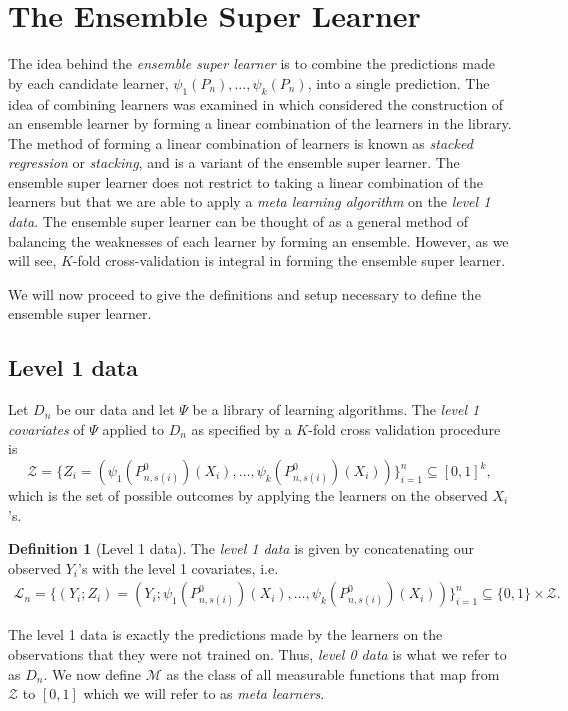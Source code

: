\documentclass[11pt, a4paper]{article}
\theoremstyle{definition}
\newtheorem{definition}[theorem]{Definition}
\theoremstyle{remark}
\newcommand{\ml}{k}
\newcommand{\la}{\psi}
\newcommand{\lib}{\Psi}
\newcommand{\lone}{\mathcal{L}}
\begin{document}
\section{The Ensemble Super Learner}
The idea behind the \textit{ensemble super learner} is to combine the predictions made by each candidate learner, $\la_1(P_{n}), \ldots, \la_k(P_{n}) $, into a single prediction. The idea of combining learners was examined in \cite{breiman1996stacked} which considered the construction of an ensemble learner by forming a linear combination of the learners in the library. The method of forming a linear combination of learners is known as \textit{stacked regression} or \textit{stacking}, and is a variant of the ensemble super learner. The ensemble super learner does not restrict to taking a linear combination of the learners but that we are able to apply a \textit{meta learning algorithm} on the \textit{level 1 data}. The ensemble super learner can be thought of as a general method of balancing the weaknesses of each learner by forming an ensemble. However, as we will see, $ K $-fold cross-validation is integral in forming the ensemble super learner. 

We will now proceed to give the definitions and setup necessary to define the ensemble super learner.
\subsection{Level 1 data}
Let $ D_n $ be our data and let $ \lib $ be a library of learning algorithms. The \textit{level 1 covariates} of $ \lib $ applied to $ D_n $ as specified by a $ K $-fold cross validation procedure is  
$$ \mathcal{Z} = \{Z_i = (\la_1(P_{n, s(i)}^{0})(X_i), \ldots, \la_\ml(P_{n, s(i)}^0)(X_i) ) \}_{i = 1}^{n} \subseteq [0,1]^{k}, $$
which is the set of possible outcomes by applying the learners on the observed $ X_i $'s. 

\begin{definition}[Level 1 data]
    The \textit{level 1 data} is given by concatenating our observed $ Y_i $'s with the level 1 covariates, i.e.
    \begin{align*}
        \lone_{n}  = \{(Y_i ; Z_i) = (Y_i; \la_1(P_{n, s(i)}^{0})(X_i), \ldots, \la_\ml(P_{n, s(i)}^{0})(X_i)) \}_{i = 1}^n \subseteq \{0,1\} \times \mathcal{Z}. 
    \end{align*}
\end{definition}
The level 1 data is exactly the predictions made by the learners on the observations that they were not trained on. Thus, \textit{level 0 data} is what we refer to as $ D_n $. 
We now define $ \mathcal{M} $ as the class of all measurable functions that map from $ \mathcal{Z} $ to $ [0,1] $ which we will refer to as \textit{meta learners}. 
\end{document}
